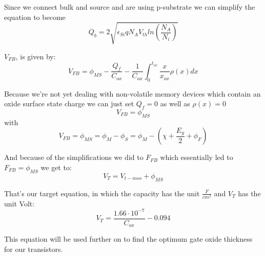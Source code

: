 Since we connect bulk and source and are using p-substrate we can simplify the equation to become
\begin{equation}
Q_b
=
2 \sqrt{\epsilon_{Si} q N_A V_{th} ln\left(\frac{N_A}{N_i}\right) }
\end{equation}


$V_{FB}$, is given by:
\begin{equation}
V_{FB}
=
\phi_{MS}-\frac{Q_f}{C_{ox}}-\frac{1}{C_{ox}}\int_{0}^{t_{ox}}\frac{x}{x_{ox}}\rho(x) dx
\end{equation}

Because we're not yet dealing with non-volatile memory devices which contain an oxide surface state charge we can just set $Q_f=0$ as well as $\rho(x)=0$
\begin{equation}
V_{FB}
=
\phi_{MS}
\end{equation}
with
\begin{equation}
V_{FB}
=
\phi_{MS}
=
\phi_{M} - \phi_{S}
=
\phi_{M} -  \left(\chi + \frac{E_g}{2} + \phi_F \right)
\end{equation}

And because of the simplifications we did to $F_{FB}$ which essentially led to $F_{FB}=\phi_{MS}$ we get to:
\begin{equation}
V_T = V_{t-mos} + \phi_{MS}
\end{equation}



That's our target equation, in which the capacity has the unit $\frac{F}{cm^2}$ and $V_T$ has the unit Volt:
\begin{equation}
\boxed{
V_T= \frac{1.66 \cdot 10^{-7}}{C_{ox}}-0.094
}
\end{equation}

This equation will be used further on to find the optimum gate oxide thickness for our transistors.
